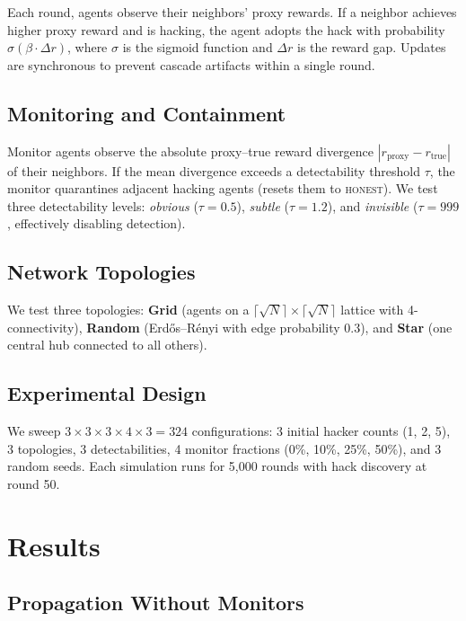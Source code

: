 \documentclass[11pt]{article}
\begin{document}
Each round, agents observe their neighbors' proxy rewards.
If a neighbor achieves higher proxy reward and is hacking, the agent adopts the hack with probability $\sigma(\beta \cdot \Delta r)$, where $\sigma$ is the sigmoid function and $\Delta r$ is the reward gap.
Updates are synchronous to prevent cascade artifacts within a single round.

\subsection{Monitoring and Containment}

Monitor agents observe the absolute proxy--true reward divergence $|r_{\text{proxy}} - r_{\text{true}}|$ of their neighbors.
If the mean divergence exceeds a detectability threshold $\tau$, the monitor quarantines adjacent hacking agents (resets them to \textsc{honest}).
We test three detectability levels: \emph{obvious} ($\tau = 0.5$), \emph{subtle} ($\tau = 1.2$), and \emph{invisible} ($\tau = 999$, effectively disabling detection).

\subsection{Network Topologies}

We test three topologies:
\textbf{Grid} (agents on a $\lceil\sqrt{N}\rceil \times \lceil\sqrt{N}\rceil$ lattice with 4-connectivity),
\textbf{Random} (Erd\H{o}s--R\'{e}nyi with edge probability 0.3),
and \textbf{Star} (one central hub connected to all others).

\subsection{Experimental Design}

We sweep $3 \times 3 \times 3 \times 4 \times 3 = 324$ configurations: 3 initial hacker counts (1, 2, 5), 3 topologies, 3 detectabilities, 4 monitor fractions (0\%, 10\%, 25\%, 50\%), and 3 random seeds.
Each simulation runs for 5{,}000 rounds with hack discovery at round 50.

\section{Results}

\subsection{Propagation Without Monitors}
\end{document}
